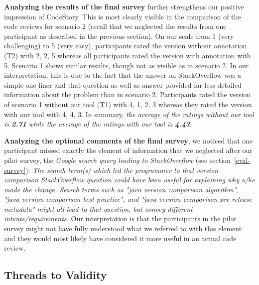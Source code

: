 \documentclass[../manifest.tex]{subfiles}
\begin{document}
\begin{itemize}
{}
\end{itemize}

\textbf{Analyzing the results of the final survey} further strengthens our positive impression of CodeStory. This is most clearly visible in the comparison of the code reviews for scenario 2 (recall that we neglected the results from one participant as described in the previous section). On our scale from 1 (very challenging) to 5 (very easy), participants rated the version without annotation (T2) with 2, 2, 5 whereas all participants rated the version with annotation with 5. Scenario 1 shows similar results, though not as visible as in scenario 2. In our interpretation, this is due to the fact that the answer on StackOverflow was a simple one-liner and that question as well as answer provided far less detailed information about the problem than in scenario 2. Participants rated the version of scenario 1 without our tool (T1) with 4, 1, 2, 3 whereas they rated the version with our tool with 4, 4, 3. In summary, \textit{the average of the ratings without our tool is \textbf{2.71} while the average of the ratings with our tool is \textbf{4.43}}.

\textbf{Analyzing the optional comments of the final survey}, we noticed that one participant missed exactly the element of information that we neglected after our pilot survey, the \textit{Google search query leading to StackOverflow} (see section~\ref{eval-survey}): \textit{The search term(s) which led the programmer to that version comparison StackOverflow question could have been useful for explaining why s/he made the change. Search terms such as "java version comparison algorithm", "java version comparison best practice", and "java version comparison pre-release metadata" might all lead to that question, but convey different intents/requirements.} Our interpretation is that the participants in the pilot survey might not have fully understood what we referred to with this element and they would most likely have considered it more useful in an actual code review.

\subsection{Threads to Validity} \label{eval-threats}

\end{document}
